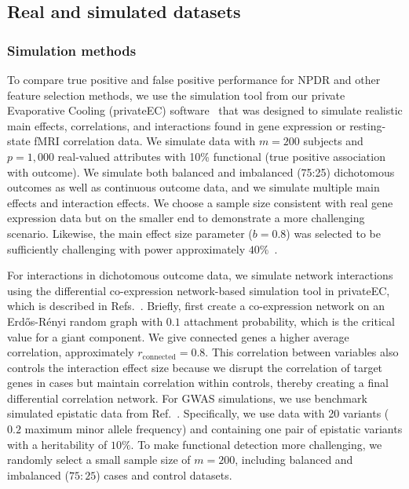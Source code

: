 \documentclass{bioinfo}
\begin{document}
\subsection{Real and simulated datasets}
\subsubsection{Simulation methods}
To compare true positive and false positive performance for NPDR and other feature selection methods, we use the simulation tool from our private Evaporative Cooling (privateEC) software~\citep{le17} that was designed to simulate realistic main effects, correlations, and interactions found in gene expression or resting-state fMRI correlation data.
We simulate data with $m=200$ subjects and $p=1,000$ real-valued attributes with 10\% functional (true positive association with outcome).
We simulate both balanced and imbalanced (75:25) dichotomous outcomes as well as continuous outcome data, and we simulate multiple main effects and interaction effects. 
We choose a sample size consistent with real gene expression data but on the smaller end to demonstrate a more challenging scenario.
Likewise, the main effect size parameter ($b=0.8$) was selected to be sufficiently challenging with power approximately $40\%$~\citep{le17}.

For interactions in dichotomous outcome data, we simulate network interactions using the differential co-expression network-based simulation tool in privateEC, which is described in Refs.~\citep{le17, lareau15}.
Briefly, first create a co-expression network on an Erd\H{o}s-R\'enyi random graph with $0.1$ attachment probability, which is the critical value for a giant component.
We give connected genes a higher average correlation, approximately $r_{\text{connected}}=0.8$.
This correlation between variables also controls the interaction effect size because we disrupt the correlation of target genes in cases but maintain correlation within controls, thereby creating a final differential correlation network.
For GWAS simulations, we use benchmark simulated epistatic data from Ref.~\citep{urbanowicz17}. Specifically, we use data with 20 variants ($0.2$ maximum minor allele frequency) and containing one pair of epistatic variants with a heritability of $10\%$. To make functional detection more challenging, we randomly select a small sample size of $m=200$, including balanced and imbalanced ($75:25$) cases and control datasets.
\end{document}
